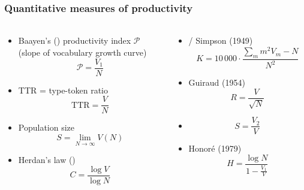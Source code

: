 \documentclass[handout,notes=show,t]{beamer} %
\begin{document}
\begin{frame}
  \frametitle{Quantitative measures of productivity}
  \framesubtitle{\citep{Tweedie:Baayen:98,Baayen:01}}

  \footnotesize
  \begin{columns}[c]
        \begin{column}{6cm}
      \ungap[1.2]
      \begin{itemize}
      \item Baayen's (\citeyear{Baayen:91}) productivity index $\mathcal{P}$\\
        (slope of vocabulary growth curve)
        \[
        \mathcal{P} = \frac{V_1}{N}
        \]
      \item TTR = type-token ratio
        \[
        \text{TTR} = \frac{V}{N}
        \]
      \item Population size
        \[
        S = \lim_{N \to \infty} V(N)
        \]
      \item Herdan's law (\citeyear{Herdan:64})
        \[
        C = \frac{\log V}{\log N}
        \]
      \end{itemize}
    \end{column}
    \begin{column}{6cm}
      \begin{itemize}
      \item<2-> \citet{Yule:44} /  Simpson (1949) 
        \[
          K = 10\,000\cdot \frac{\sum_m m^2 V_m - N}{N^2}
        \]
      \item<2-> Guiraud (1954)
        \[
          R = \frac{V}{\sqrt{N}}
        \]
      \item<2-> \citet{Sichel:75}
        \[
          S = \frac{V_2}{V}
        \]
      \item<2-> Honoré (1979)
        \[
          H = \frac{\log N}{1 - \frac{V_1}{V}}
        \]
      \end{itemize}
    \end{column}
  \end{columns}  
\end{frame}
\end{document}

